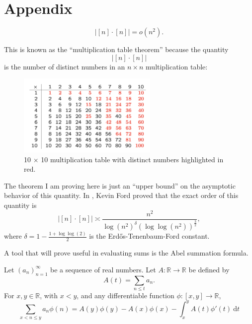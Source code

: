 \documentclass[12pt]{amsart}
\begin{document}


\section*{Appendix}

\begin{theorem*}
\[
    \left\lvert [n] \cdot [n] \right\rvert = o(n^{2})
.\]
\end{theorem*}

This is known as the ``multiplication table theorem'' because the quantity
\[
    \left\lvert [n] \cdot [n] \right\rvert 
\]
is the number of distinct numbers in an \(n \times n\) multiplication table:

\begin{figure}[h]
    \centering
    \includegraphics[width=0.6\textwidth]{mult-table.png}
    \caption{10 \(\times \) 10 multiplication table with distinct numbers highlighted in red.}
\end{figure}

The theorem I am proving here is just an ``upper bound'' on the asymptotic behavior of
this quantity. In \cite{Ford}, Kevin Ford proved that the exact order of this quantity is
\[
    \left\lvert [n] \cdot [n] \right\rvert \asymp \frac{n^{2}}{\log \left( n^{2} \right) ^{\delta} \left( \log \log \left( n^{2} \right) \right) ^{\frac{3}{2} } } 
,\]
where \(\delta = 1 - \frac{1 + \log \log \left( 2 \right)  }{2} \) is the Erd\H{o}s-Tenenbaum-Ford constant.

A tool that will prove useful in evaluating sums is the Abel summation formula.

\begin{lemma*}
Let \(\left( a_{n}  \right) _{n = 1} ^{\infty }\) be a sequence of real numbers. Let \(A: \mathbb{R} \to \mathbb{R} \) be defined by
\[
    A(t) = \sum _{n \leq t} a_{n} 
.\]
For \(x,y \in \mathbb{R} \), with \(x < y\), and any differentiable function \(\phi : [x,y] \to \mathbb{R} \),
\[
    \sum _{x < n \leq y} a_{n} \phi(n) = A(y)\phi(y) - A(x) \phi(x) - \int_{x}^{y} A(t)\phi'(t) ~\mathrm{d} t
\]
\end{lemma*}
\end{document}
